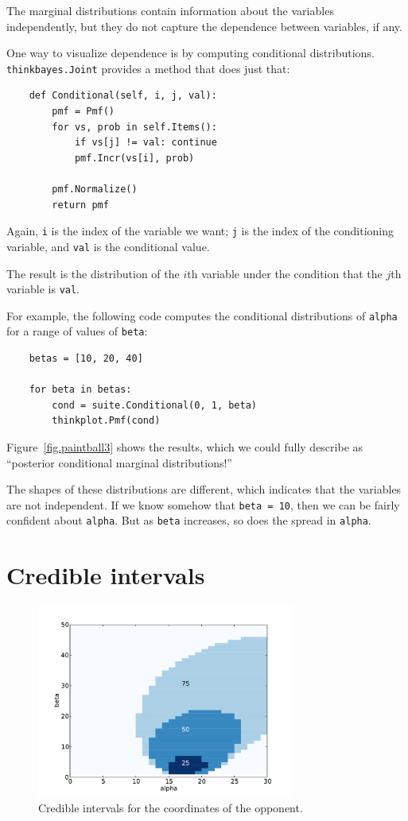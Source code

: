 \documentclass[12pt]{book}
\begin{document}
The marginal distributions contain information about the variables
independently, but they do not capture the dependence between
variables, if any.

One way to visualize dependence is by computing conditional
distributions.  {\tt thinkbayes.Joint} provides a method that
does just that:

\begin{verbatim}
    def Conditional(self, i, j, val):
        pmf = Pmf()
        for vs, prob in self.Items():
            if vs[j] != val: continue
            pmf.Incr(vs[i], prob)

        pmf.Normalize()
        return pmf
\end{verbatim}

Again, {\tt i} is the index of the variable we want; {\tt j}
is the index of the conditioning variable, and {\tt val} is the
conditional value.

The result is the distribution of the $i$th variable under the
condition that the $j$th variable is {\tt val}.

For example, the following code computes the conditional distributions
of {\tt alpha} for a range of values of {\tt beta}:

\begin{verbatim}
    betas = [10, 20, 40]

    for beta in betas:
        cond = suite.Conditional(0, 1, beta)
        thinkplot.Pmf(cond)
\end{verbatim}

Figure~\ref{fig.paintball3} shows the results, which we could
fully describe as ``posterior conditional marginal distributions!''

The shapes of these distributions are different, which indicates
that the variables are not independent.  If we know somehow that
{\tt beta = 10}, then we can be fairly confident about {\tt alpha}.
But as {\tt beta} increases, so does the spread in {\tt alpha}.


\section{Credible intervals}

\begin{figure}
\centerline{\includegraphics[height=2.5in]{figs/paintball5.pdf}}
\caption{Credible intervals for the coordinates of the opponent.}
\label{fig.paintball5}
\end{figure}
\end{document}
